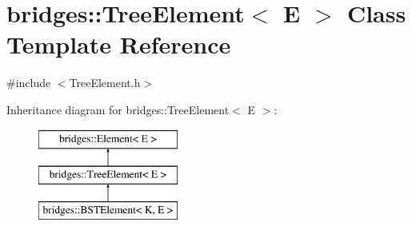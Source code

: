 \hypertarget{classbridges_1_1_tree_element}{}\section{bridges\+:\+:Tree\+Element$<$ E $>$ Class Template Reference}
\label{classbridges_1_1_tree_element}


{\ttfamily \#include $<$Tree\+Element.\+h$>$}

Inheritance diagram for bridges\+:\+:Tree\+Element$<$ E $>$\+:\begin{figure}[H]
\begin{center}
\leavevmode
\includegraphics[height=3.000000cm]{classbridges_1_1_tree_element}
\end{center}
\end{figure}
